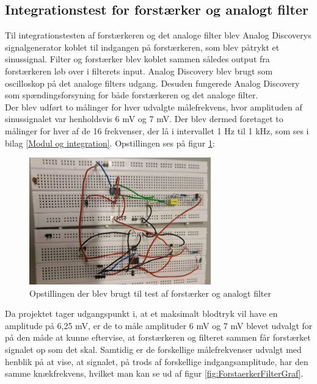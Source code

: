 \subsection{Integrationstest for forstærker og analogt filter}
Til integrationstesten af forstærkeren og det analoge filter blev Analog Discoverys signalgenerator koblet til indgangen på forstærkeren, som blev påtrykt et sinussignal. Filter og forstærker blev koblet sammen således output fra forstærkeren løb over i filterets input. Analog Discovery blev brugt som oscilloskop på det analoge filters udgang. Desuden fungerede Analog Discovery som spændingsforsyning for både forstærkeren og det analoge filter.\\
Der blev udført to målinger for hver udvalgte målefrekvens, hvor amplituden af sinussignalet var henholdsvis 6 mV og 7 mV. Der blev dermed foretaget to målinger for hver af de 16 frekvenser, der lå i intervallet 1 Hz til 1 kHz, som ses i bilag \ref{Modul og integration}. Opstillingen ses på figur \ref{fig:ForstaerkerFilterOpstiling}:

\begin{figure}[H]
	\centering
	\includegraphics[width=0.7\textwidth]{Figurer/Hardware/samletopstilling}
	\caption{Opstillingen der blev brugt til test af forstærker og analogt filter}
	\label{fig:ForstaerkerFilterOpstiling}
\end{figure}

Da projektet tager udgangspunkt i, at et maksimalt blodtryk vil have en amplitude på 6,25 mV, er de to måle amplituder 6 mV og 7 mV blevet udvalgt for på den måde at kunne eftervise, at forstærkeren og filteret sammen får forstærket signalet op som det skal. Samtidig er de forskellige målefrekvenser udvalgt med henblik på at vise, at signalet, på trods af forskellige indgangsamplitude, har den samme knækfrekvens, hvilket man kan se ud af figur \ref{fig:ForstaerkerFilterGraf}.

